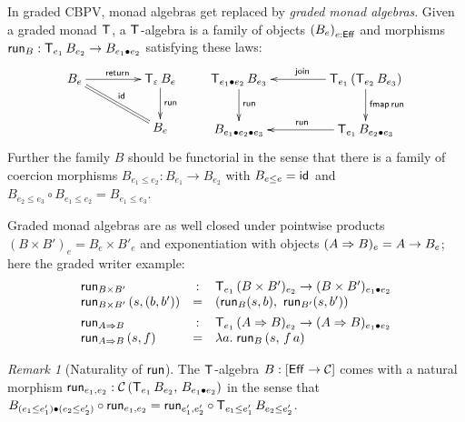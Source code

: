 \documentclass[acmsmall,review,anonymous]{acmart}\settopmatter{printfolios=true,printccs=false,printacmref=false}
\theoremstyle{remark}
\newtheorem{remark}{Remark}
\begin{document}
In graded CBPV, monad algebras get replaced by \emph{graded monad
  algebras}.  Given a graded monad $\T$, a $\T$-algebra is a family of
objects $\left(B_e\right)_{e:\Eff}$ and morphisms
$\run[B] : \T[e_1]\,B_{e_2} \to B_{e_1 \bu e_2}$ satisfying these
laws:
\[
\xymatrix@C=10ex{
  B_e     \ar[r]^{\treturn} \ar@{=}[dr]^{\tid}
& \T[\Ge]\,B_e \ar[d]^{\run[]}
\\
& B_e
}
\qquad
\xymatrix@C=10ex{
  \T[e_1 \bu e_2]\,B_{e_3} \ar[d]^{\run[]}
& \T[e_1]\,(\T[e_2]\,B_{e_3}) \ar[l]_{\tjoin} \ar[d]^{\tfmap\,\run[]}
\\
  B_{e_1 \bu e_2 \bu e_3}
& \T[e_1]\,B_{e_2 \bu e_3} \ar[l]_{\run[]}
}
\]
Further the family $B$ should be functorial in the sense that there is
a family of coercion morphisms $B_{e_1 \leq e_2} : B_{e_1} \to B_{e_2}$ with
$B_{e \leq e} = \tid$ and $B_{e_2 \leq e_3} \circ B_{e_1 \leq e_2} =
B_{e_1 \leq e_3}$.

Graded monad algebras are as well closed under
pointwise products $(B \times B')_e = B_e \times B'_e$ and
exponentiation with objects $(A \To B)_e = A \to B_e$;
here the graded writer example:
\[
\begin{array}{lcl}
  \run[B \times B'] & : & \T[e_1]\,(B \times B')_{e_2} \to (B \times
                          B')_{e_1 \bu e_2} \\
  \run[B \times B']\, (s,(b,b')) & = & (\run[B] (s,b),\
                                           \run[B'] (s,b'))
\\[1ex]
  \run[A \To B] & : & \T[e_1]\,(A \To B)_{e_2} \to (A \To B)_{e_1 \bu e_2} \\
  \run[A \To B]\, (s,f) & = & \lambda a.\; \run[B]\,(s,\,f\,a)
\\
\end{array}
\]

\begin{remark}[Naturality of $\trun$]
  The $\T$-algebra $B : [\Eff \to \CC]$ comes with a natural morphism
  $\run[e_1,e_2] : \Hom {\T[e_1]\,B_{e_2}} {B_{e_1 \bu e_2}}$ in the
  sense that
  $B_{(e_1\leq e_1') \bu (e_2 \leq e_2')} \comp {\run[e_1,e_2]} =
  {\run[e_1',e_2']} \comp \T[e_1 \leq e_1']\,B_{e_2 \leq e_2'}$.
\end{remark}
\end{document}

